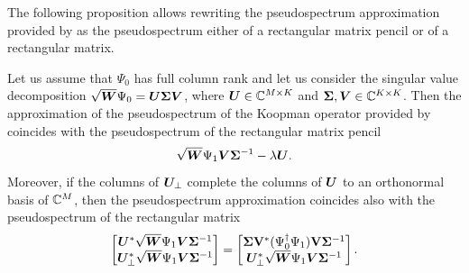 The following proposition allows rewriting the pseudospectrum approximation provided by  as the pseudospectrum either of a rectangular matrix pencil or of a rectangular matrix.
\begin{prop}
\label{prop_pseudospectrum}
Let us assume that $\Psi_0$ has full column rank and let us consider the singular value decomposition $\sqrt{\vb*{W}}\Psi_0 = \vb*{U}\bm{\Sigma}\vb*{V}$, where $\vb*{U}\in\mathbb{C}^{M\times K}$ and $\bm{\Sigma},\vb*{V}\in\mathbb{C}^{K\times K}$. Then the approximation of the pseudospectrum of the Koopman operator provided by  coincides with the pseudospectrum of the rectangular matrix pencil
\begin{equation}
    \sqrt{\vb*{W}}\Psi_1 \vb*{V}\bm{\Sigma}^{-1} - \lambda\vb*{U}.
\end{equation}
Moreover, if the columns of $\vb*{U}_{\perp}$ complete the columns of $\vb*{U}$ to an orthonormal basis of $\mathbb{C}^{M}$, then the pseudospectrum approximation coincides also with the pseudospectrum of the rectangular matrix
\begin{equation}
    \begin{bmatrix}
    \vb*{U}^*\sqrt{\vb*{W}}\Psi_1 \vb*{V}\bm{\Sigma}^{-1}\\
    \vb*{U}_{\perp}^*\sqrt{\vb*{W}}\Psi_1 \vb*{V}\bm{\Sigma}^{-1}
    \end{bmatrix} = 
    \begin{bmatrix}
    \bm{\Sigma}\vb{V}^*(\Psi_0^\dagger \Psi_1)\vb{V}\bm{\Sigma}^{-1}\\
    \vb*{U}_{\perp}^*\sqrt{\vb*{W}}\Psi_1 \vb*{V}\bm{\Sigma}^{-1}
    \end{bmatrix}.
\end{equation}
\end{prop}
